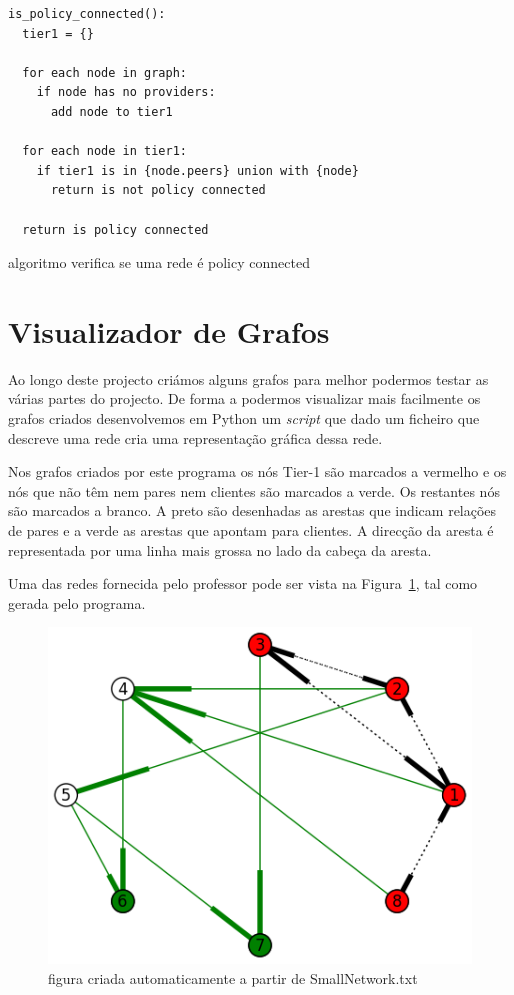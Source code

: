 \documentclass[10pt,a4paper]{article}
\begin{document}
\begin{algorithm}
\begin{lstlisting}
is_policy_connected():
  tier1 = {}

  for each node in graph:
    if node has no providers:
      add node to tier1

  for each node in tier1:
    if tier1 is in {node.peers} union with {node}
      return is not policy connected

  return is policy connected
\end{lstlisting}
\caption{algoritmo verifica se uma rede é policy connected}
\label{algo:testpolicy}
\end{algorithm}


\section{Visualizador de Grafos}
Ao longo deste projecto criámos alguns grafos para melhor podermos testar as várias partes do projecto. De forma a podermos visualizar mais facilmente os grafos criados desenvolvemos em Python um \textit{script} que dado um ficheiro que descreve uma rede cria uma representação gráfica dessa rede.

Nos grafos criados por este programa os nós Tier-1 são marcados a vermelho e os nós que não têm nem pares nem clientes são marcados a verde. Os restantes nós são marcados a branco. A preto são desenhadas as arestas que indicam relações de pares e a verde as arestas que apontam para clientes. A direcção da aresta é representada por uma linha mais grossa no lado da cabeça da aresta.

Uma das redes fornecida pelo professor pode ser vista na Figura~\ref{fig:SmallNetwork}, tal como gerada pelo programa.

\begin{figure}[h]
\centering
\includegraphics[scale=0.6]{SmallNetwork}
\caption{figura criada automaticamente a partir de SmallNetwork.txt}
\label{fig:SmallNetwork}
\end{figure}
\end{document}
